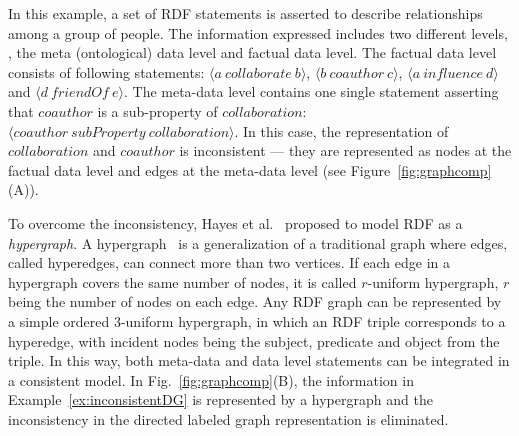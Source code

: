 \begin{myexp}
\label{ex:inconsistentDG}
In this example, a set of RDF statements is asserted to describe relationships among a group of people. The information expressed includes two different levels, \ie, the meta (ontological) data level and factual data level. The factual data level consists of following statements: $\langle a~ collaborate~ b\rangle$, $\langle b~ coauthor~ c\rangle$, $\langle a~ influence~ d\rangle$ and $\langle d~ friendOf~ e\rangle$. The meta-data level contains one single statement asserting that $coauthor$ is a sub-property of $collaboration$: $\langle coauthor~ subProperty~ collaboration\rangle$. In this case, the representation of $collaboration$ and $coauthor$ is inconsistent --- they are represented as nodes at the factual data level and edges at the meta-data level (see Figure~\ref{fig:graphcomp}(A)).
\end{myexp}

To overcome the inconsistency, Hayes et al.~\cite{GraphModelRDF} proposed to model RDF as a \emph{hypergraph}. A hypergraph~\cite{Hypergraph} is a generalization of a traditional graph where edges, called hyperedges, can connect more than two vertices. If each edge in a hypergraph covers the same number of nodes, it is called $r$-uniform hypergraph, $r$ being the number of nodes on each edge. Any RDF graph can be represented by a simple ordered 3-uniform hypergraph, in which an RDF triple corresponds to a hyperedge, with incident nodes being the subject, predicate and object from the triple. In this way, both meta-data and data level statements can be integrated in a consistent model.
In Fig.~\ref{fig:graphcomp}(B), the information in Example~\ref{ex:inconsistentDG} is represented by a hypergraph and the inconsistency in the directed labeled graph representation is eliminated.
%

